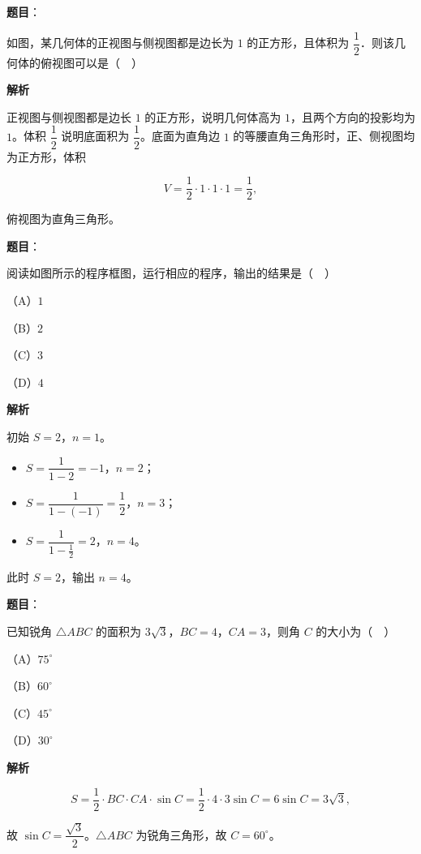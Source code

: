 \begin{answer}

\textbf{题目}：

如图，某几何体的正视图与侧视图都是边长为 $1$ 的正方形，且体积为 $\dfrac12$．则该几何体的俯视图可以是（　）
\nopagebreak[4]
\begin{center}\end{center}
\nopagebreak[4]
\textbf{解析}

正视图与侧视图都是边长 $1$ 的正方形，说明几何体高为 $1$，且两个方向的投影均为 $1$。体积 $\dfrac12$ 说明底面积为 $\dfrac12$。底面为直角边 $1$ 的等腰直角三角形时，正、侧视图均为正方形，体积

\nopagebreak[4]
\[V=\frac12\cdot1\cdot1\cdot1=\frac12,\]

俯视图为直角三角形。


\end{answer}
\begin{answer}

\textbf{题目}：

阅读如图所示的程序框图，运行相应的程序，输出的结果是（　）
\nopagebreak[4]
\begin{center}\end{center}
\nopagebreak[4]
（A）$1$

（B）$2$

（C）$3$

（D）$4$

\textbf{解析}

初始 $S=2$，$n=1$。

\begin{itemize}
\item $S=\dfrac1{1-2}=-1$，$n=2$；
\item $S=\dfrac1{1-(-1)}=\dfrac12$，$n=3$；
\item $S=\dfrac1{1-\frac12}=2$，$n=4$。
\end{itemize}

此时 $S=2$，输出 $n=4$。


\end{answer}
\begin{answer}

\textbf{题目}：

已知锐角 $\triangle ABC$ 的面积为 $3\sqrt3$，$BC=4$，$CA=3$，则角 $C$ 的大小为（　）

（A）$75^\circ$

（B）$60^\circ$

（C）$45^\circ$

（D）$30^\circ$

\textbf{解析}

\nopagebreak[4]
\[S=\frac12\cdot BC\cdot CA\cdot\sin C
=\frac12\cdot4\cdot3\sin C=6\sin C=3\sqrt3,\]

故 $\sin C=\dfrac{\sqrt3}2$。$\triangle ABC$ 为锐角三角形，故 $C=60^\circ$。


\end{answer}
